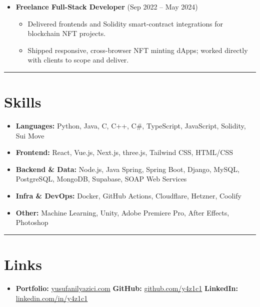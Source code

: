 \documentclass{article}
\begin{document}
\begin{itemize}
\begin{itemize}
        \item Owned the DevOps pipeline: deployment automation and infrastructure management.
    \end{itemize}
    \item \textbf{Freelance Full-Stack Developer} (Sep 2022 -- May 2024)
    \begin{itemize}
        \item Delivered frontends and Solidity smart-contract integrations for blockchain NFT projects.
        \item Shipped responsive, cross-browser NFT minting dApps; worked directly with clients to scope and deliver.
    \end{itemize}
\end{itemize}

\hrule
\vspace{0.1em}
\section*{Skills}
\vspace{-0.5em}
\begin{itemize}
    \item \textbf{Languages:} Python, Java, C, C++, C\#, TypeScript, JavaScript, Solidity, Sui Move
    \item \textbf{Frontend:} React, Vue.js, Next.js, three.js, Tailwind CSS, HTML/CSS
    \item \textbf{Backend \& Data:} Node.js, Java Spring, Spring Boot, Django, MySQL, PostgreSQL, MongoDB, Supabase, SOAP Web Services
    \item \textbf{Infra \& DevOps:} Docker, GitHub Actions, Cloudflare, Hetzner, Coolify
    \item \textbf{Other:} Machine Learning, Unity, Adobe Premiere Pro, After Effects, Photoshop
\end{itemize}

\hrule
\vspace{0.1em}
\section*{Links}
\vspace{-0.5em}
\begin{itemize}
    \item \textbf{Portfolio:} \href{https://yusufanilyazici.com}{yusufanilyazici.com} \quad \textbf{GitHub:} \href{https://github.com/y4z1c1}{github.com/y4z1c1} \quad \textbf{LinkedIn:} \href{https://www.linkedin.com/in/y4z1c1/}{linkedin.com/in/y4z1c1}
\end{itemize}
\end{document}
